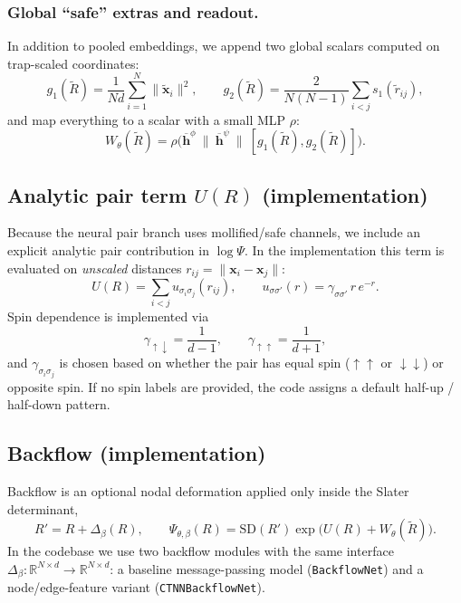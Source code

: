 \documentclass[superscriptaddress,unsortedaddress,amsmath,amssymb,aps]{revtex4-2}
\begin{document}
\subsubsection{Global ``safe'' extras and readout.}
In addition to pooled embeddings, we append two global scalars computed on trap-scaled coordinates:
\begin{equation}
  g_1(\tilde R)=\frac{1}{Nd}\sum_{i=1}^N\|\tilde{\mathbf x}_i\|^2,
  \qquad
  g_2(\tilde R)=\frac{2}{N(N-1)}\sum_{i<j} s_1(\tilde r_{ij}),
\end{equation}
and map everything to a scalar with a small MLP $\rho$:
\begin{equation}
  W_\theta(\tilde R)
  = \rho\!\Big(\overline{\mathbf h}^{\phi}\ \|\ \overline{\mathbf h}^{\psi}\ \|\ [g_1(\tilde R),g_2(\tilde R)]\Big).
  \label{eq:nqs-readout-impl}
\end{equation}

\subsection{Analytic pair term $U(R)$ (implementation)}
\label{subsec:cusp-impl}

Because the neural pair branch uses mollified/safe channels, we include an explicit analytic pair contribution
in $\log\Psi$. In the implementation this term is evaluated on \emph{unscaled} distances $r_{ij}=\|\mathbf x_i-\mathbf x_j\|$:
\begin{equation}
  U(R)=\sum_{i<j} u_{\sigma_i\sigma_j}(r_{ij}),
  \qquad
  u_{\sigma\sigma'}(r)=\gamma_{\sigma\sigma'}\,r\,e^{-r}.
  \label{eq:u-impl}
\end{equation}
Spin dependence is implemented via
\begin{equation}
  \gamma_{\uparrow\downarrow}=\frac{1}{d-1},
  \qquad
  \gamma_{\uparrow\uparrow}=\frac{1}{d+1},
\end{equation}
and $\gamma_{\sigma_i\sigma_j}$ is chosen based on whether the pair has equal spin ($\uparrow\uparrow$ or $\downarrow\downarrow$)
or opposite spin. If no spin labels are provided, the code assigns a default half-up / half-down pattern.

\subsection{Backflow (implementation)}
\label{subsec:backflow-impl}

Backflow is an optional nodal deformation applied only inside the Slater determinant,
\[
  R' = R + \Delta_\beta(R),
  \qquad
  \Psi_{\theta,\beta}(R)=\mathrm{SD}(R')\exp\!\big(U(R)+W_\theta(\tilde R)\big).
\]
In the codebase we use two backflow modules with the same interface $\Delta_\beta:\mathbb R^{N\times d}\to\mathbb R^{N\times d}$:
a baseline message-passing model (\texttt{BackflowNet}) and a node/edge-feature variant (\texttt{CTNNBackflowNet}).
\end{document}
